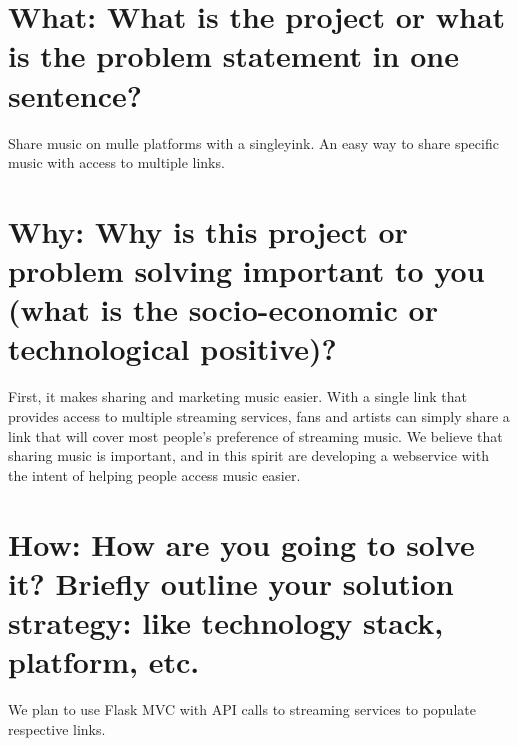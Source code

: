 \section*{What: What is the project or what is the problem statement in one sentence?}
\doublespacing

Share music on mulle platforms with a singleyink.
An easy way to share specific music with access to multiple links.
  
 
\singlespacing
\section*{Why: Why is this project or problem solving important to you (what is the socio-economic or technological positive)?}
\doublespacing

First, it makes sharing and marketing music easier. With a single link that provides access to multiple streaming services, fans and artists can simply share a link that will cover most people's preference of streaming music. We believe that sharing music is important, and in this spirit are developing a webservice with the intent of helping people access music easier.

\singlespacing
\section*{How: How are you going to solve it? Briefly outline your solution strategy: like technology stack, platform, etc.}
\doublespacing

We plan to use Flask MVC with API calls to streaming services to populate respective links.